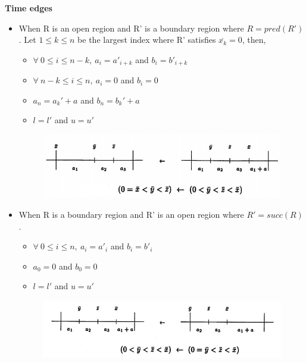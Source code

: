 \documentclass[a4paper,UKenglish,cleveref, autoref, thm-restate]{lipics-v2019}
\begin{document}
\textbf{Time edges} 
\begin{itemize}
\item When R is an open region and R' is a boundary region where $R=pred(R')$. Let $1\leq k \leq n$ be the largest index where R' satisfies $\overline{x_k} = 0$, then,
\begin{itemize}
\item $\forall\ 0 \leq i \leq n-k,\ a_i = a'_{i+k}$ and $b_i = b'_{i+k}$
\item $\forall\ n-k \leq i \leq n,\ a_i = 0$ and $b_i = 0$
\item $a_n = a_k' + a$ and $b_n = b_k' + a$
\item $l=l'$ and $u=u'$
\end{itemize}
\begin{figure}[h]
\centering
\includegraphics[scale=.4]{2}
\end{figure}
\end{itemize} 

\begin{itemize}
\item When R is a boundary region and R' is an open region where $R'=succ(R)$.
\begin{itemize}
\item $\forall\ 0 \leq i \leq n,\ a_i = a'_{i}$ and $b_i = b'_{i}$
\item $a_0 = 0$ and $b_0 = 0$
\item $l=l'$ and $u=u'$
\end{itemize}
\begin{figure}[h]
\centering
\includegraphics[scale=.4]{1a}
\end{figure}
\end{itemize} 
\end{document}
